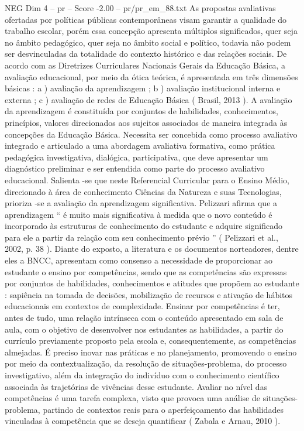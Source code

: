\begin{textsample}{NEG Dim 4 – pr – Score -2.00 – pr/pr\_em\_88.txt}
As propostas avaliativas ofertadas por políticas públicas contemporâneas visam garantir a qualidade do trabalho escolar, porém essa concepção apresenta múltiplos significados, quer seja no âmbito pedagógico, quer seja no âmbito social e político, todavia não podem ser desvinculadas da totalidade do contexto histórico e das relações sociais.
De acordo com as Diretrizes Curriculares Nacionais Gerais da Educação Básica, a avaliação educacional, por meio da ótica teórica, é apresentada em três dimensões básicas : a ) avaliação da aprendizagem ; b ) avaliação institucional interna e externa ; c ) avaliação de redes de Educação Básica ( Brasil, 2013 ).
A avaliação da aprendizagem é constituída por conjuntos de habilidades, conhecimentos, princípios, valores direcionados aos sujeitos associados de maneira integrada às concepções da Educação Básica.
Necessita ser concebida como processo avaliativo integrado e articulado a uma abordagem avaliativa formativa, como prática pedagógica investigativa, dialógica, participativa, que deve apresentar um diagnóstico preliminar e ser entendida como parte do processo avaliativo educacional.
Salienta -se que neste Referencial Curricular para o Ensino Médio, direcionado à área de conhecimento Ciências da Natureza e suas Tecnologias, prioriza -se a avaliação da aprendizagem significativa.
Pelizzari afirma que a aprendizagem “ é muito mais significativa à medida que o novo conteúdo é incorporado às estruturas de conhecimento do estudante e adquire significado para ele a partir da relação com seu conhecimento prévio ” ( Pelizzari et al., 2002, p. 38 ).
Diante do exposto, a literatura e os documentos norteadores, dentre eles a BNCC, apresentam como consenso a necessidade de proporcionar ao estudante o ensino por competências, sendo que as competências são expressas por conjuntos de habilidades, conhecimentos e atitudes que propõem ao estudante : sapiência na tomada de decisões, mobilização de recursos e ativação de hábitos educacionais em contextos de complexidade.
Ensinar por competências é ter, antes de tudo, uma relação intrínseca com o conteúdo apresentado em sala de aula, com o objetivo de desenvolver nos estudantes as habilidades, a partir do currículo previamente proposto pela escola e, consequentemente, as competências almejadas.
É preciso inovar nas práticas e no planejamento, promovendo o ensino por meio da contextualização, da resolução de situações-problema, do processo investigativo, além da integração do indivíduo com o conhecimento científico associada às trajetórias de vivências desse estudante.
Avaliar no nível das competências é uma tarefa complexa, visto que provoca uma análise de situações-problema, partindo de contextos reais para o aperfeiçoamento das habilidades vinculadas à competência que se deseja quantificar ( Zabala e Arnau, 2010 ).

\end{textsample}
